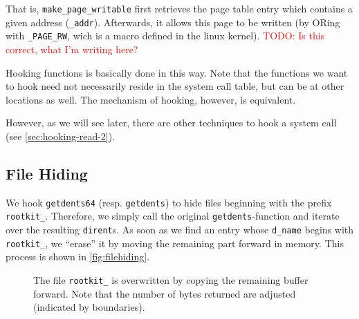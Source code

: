 \documentclass[10pt, letterpaper]{article}
\newcommand{\todo}[1]{\textcolor{red}{TODO: #1}}
\begin{document}
That is, \texttt{make\_page\_writable} first retrieves the page table entry which contains a given address (\texttt{\_addr}). Afterwards, it allows this page to be written (by ORing with \texttt{\_PAGE\_RW}, wich is a macro defined in the linux kernel). \todo{Is this correct, what I'm writing here?}

Hooking functions is basically done in this way. Note that the functions we want to hook need not necessarily reside in the system call table, but can be at other locations as well. The mechanism of hooking, however, is equivalent.

However, as we will see later, there are other techniques to hook a system call (see \autoref{sec:hooking-read-2}).

\subsection{File Hiding}
\label{filehiding}

We hook \texttt{getdents64} (resp. \texttt{getdents}) to hide files beginning with the prefix \texttt{rootkit\_}. 
Therefore, we simply call the original \texttt{getdents}-function and iterate over the resulting
\texttt{dirent}s. As soon as we find an entry whose \texttt{d\_name} begins with \texttt{rootkit\_},
we ``erase'' it by moving the remaining part forward in memory. This process is shown in \autoref{fig:filehiding}.


\begin{figure}[ht]
\centering
{}
\caption{The file \texttt{rootkit\_} is overwritten by copying the remaining buffer forward. Note that the number of bytes returned are adjusted (indicated by boundaries).}
\label{fig:filehiding}
\end{figure}
\end{document}
